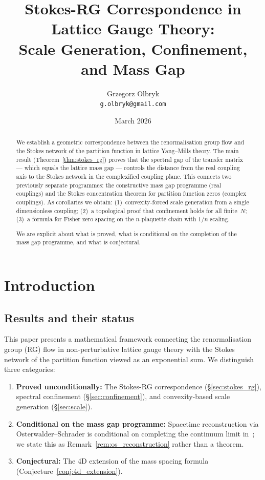 \documentclass[12pt]{article}
\title{Stokes-RG Correspondence in Lattice Gauge Theory:\\[6pt]
\large Scale Generation, Confinement, and Mass Gap}
\author{Grzegorz Olbryk\\[-2pt]
\small\texttt{g.olbryk@gmail.com}}
\date{March 2026}
\theoremstyle{definition}
\theoremstyle{remark}
\begin{document}
\maketitle

\begin{abstract}
We establish a geometric correspondence between the renormalisation
group flow and the Stokes network of the partition function in
lattice Yang--Mills theory.  The main result
(Theorem~\ref{thm:stokes_rg}) proves that the spectral gap of
the transfer matrix --- which equals the lattice mass gap ---
controls the distance from the real coupling axis to the Stokes
network in the complexified coupling plane.  This connects two
previously separate programmes: the constructive mass gap
programme (real couplings) and the Stokes concentration theorem
for partition function zeros (complex couplings).  As corollaries
we obtain: (1)~convexity-forced scale generation from a single
dimensionless coupling; (2)~a topological proof that confinement
holds for all finite~$N$; (3)~a formula for Fisher zero spacing
on the $n$-plaquette chain with $1/n$ scaling.

We are explicit about what is proved, what is conditional on the
completion of the mass gap programme, and what is conjectural.
\end{abstract}

\tableofcontents

\section{Introduction}
\label{sec:intro}

\subsection{Results and their status}

This paper presents a mathematical framework connecting the
renormalisation group (RG) flow in non-perturbative lattice gauge
theory with the Stokes network of the partition function viewed as
an exponential sum.  We distinguish three categories:

\begin{enumerate}[label=(\Alph*)]
\item \textbf{Proved unconditionally:} The Stokes-RG correspondence
  (\S\ref{sec:stokes_rg}), spectral confinement
  (\S\ref{sec:confinement}), and convexity-based scale generation
  (\S\ref{sec:scale}).
\item \textbf{Conditional on the mass gap programme:} Spacetime
  reconstruction via Osterwalder--Schrader is conditional on
  completing the continuum limit in~\cite{Olbryk2026MG}; we state
  this as Remark~\ref{rem:os_reconstruction} rather than a theorem.
\item \textbf{Conjectural:} The 4D extension of the mass spacing
  formula (Conjecture~\ref{conj:4d_extension}).
\end{enumerate}
\end{document}

